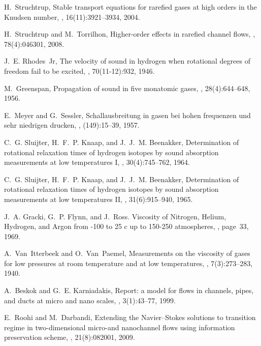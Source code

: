 \documentclass[sn-mathphys]{sn-jnl}%
\theoremstyle{thmstyleone}%
\theoremstyle{thmstyletwo}%
\theoremstyle{thmstylethree}%
\begin{document}
\begin{thebibliography}{9}
	H.~Struchtrup,
	\newblock Stable transport equations for rarefied gases at high orders in the
	{K}nudsen number,
	, 16(11):3921--3934, 2004.
	
	H.~Struchtrup and M.~Torrilhon,
	\newblock Higher-order effects in rarefied channel flows,
	, 78(4):046301, 2008.
	
	J.~E. Rhodes~Jr,
	\newblock The velocity of sound in hydrogen when rotational degrees of freedom
	fail to be excited,
	, 70(11-12):932, 1946.
	
	M.~Greenspan,
	\newblock Propagation of sound in five monatomic gases,
	,
	28(4):644--648, 1956.
	
	E.~Meyer and G.~Sessler,
	\newblock Schallausbreitung in gasen bei hohen frequenzen und sehr niedrigen
	drucken,
	, (149):15--39, 1957.
	
	C.~G. Sluijter, H.~F.~P. Knaap, and J.~J.~M. Beenakker,
	\newblock Determination of rotational relaxation times of hydrogen isotopes by
	sound absorption measurements at low temperatures {I},
	, 30(4):745--762, 1964.
	
	C.~G. Sluijter, H.~F.~P. Knaap, and J.~J.~M. Beenakker,
	\newblock Determination of rotational relaxation times of hydrogen isotopes by
	sound absorption measurements at low temperatures {II},
	, 31(6):915--940, 1965.
	
	J.~A. Gracki, G.~P. Flynn, and J.~Ross.
	\newblock Viscosity of {N}itrogen, {H}elium, {H}ydrogen, and {A}rgon from -100
	to 25 c up to 150-250 atmospheres,
	, page~33, 1969.
	
	A.~Van~Itterbeek and O.~Van~Paemel,
	\newblock Measurements on the viscosity of gases for low pressures at room
	temperature and at low temperatures,
	, 7(3):273--283, 1940.
	
	A.~Beskok and G.~E. Karniadakis,
	\newblock Report: a model for flows in channels, pipes, and ducts at micro and
	nano scales,
	, 3(1):43--77, 1999.
	
	E.~Roohi and M.~Darbandi,
	\newblock Extending the {N}avier--{S}tokes solutions to transition regime in
	two-dimensional micro-and nanochannel flows using information preservation
	scheme,
	, 21(8):082001, 2009.
	

\end{thebibliography}
\end{document}
